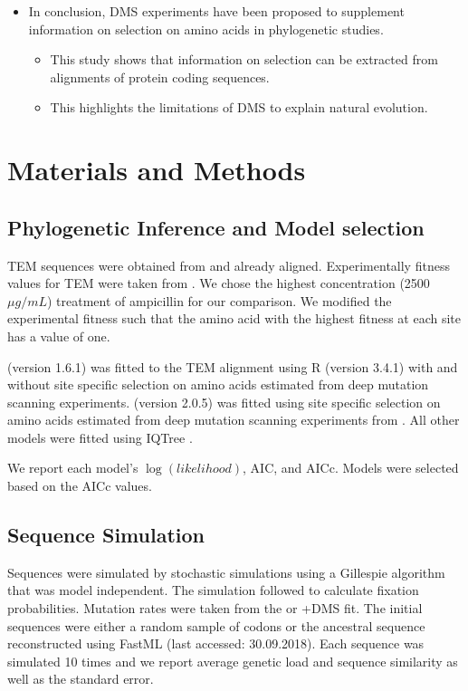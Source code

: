 \documentclass[12pt]{article}
\begin{document}
\begin{itemize}
	\item In conclusion, DMS experiments have been proposed to supplement information on selection on amino acids in phylogenetic studies.
	\begin{itemize}
		\item This study shows that information on selection can be extracted from alignments of protein coding sequences.
		\item This highlights the limitations of DMS to explain natural evolution.
	\end{itemize}
\end{itemize}


\section*{Materials and Methods}

\subsection*{Phylogenetic Inference and Model selection}

TEM sequences were obtained from \citet{bloom2017} and already aligned. 
Experimentally fitness values for TEM were taken from \citet{stiffler2016}.
We chose the highest concentration (2500 $\mu g/mL$) treatment of ampicillin for our comparison.
We modified the experimental fitness such that the amino acid with the highest fitness at each site has a value of one.

\selac (version 1.6.1) was fitted to the TEM alignment using R (version 3.4.1) \citep{rcore} with and without site specific selection on amino acids estimated from deep mutation scanning experiments.
\phydms (version 2.0.5) was fitted using site specific selection on amino acids estimated from deep mutation scanning experiments from \citet{stiffler2016}.
All other models were fitted using IQTree \citep{nguyen2015}.

We report each model's $\log(likelihood)$, AIC, and  AICc. 
Models were selected based on the AICc values.

\subsection*{Sequence Simulation}

Sequences were simulated by stochastic simulations using a Gillespie algorithm \citep{gillespie1976} that was model independent.
The simulation followed \citet{SellaAndHirsh2005} to calculate fixation probabilities.
Mutation rates were taken from the \selac or \selac+DMS fit.
The initial sequences were either a random sample of codons or the ancestral sequence reconstructed using FastML \citep{fastml} (last accessed: 30.09.2018).
Each sequence was simulated 10 times and we report average genetic load and sequence similarity as well as the standard error.
\end{document}
